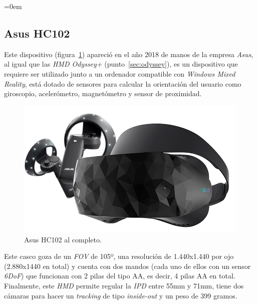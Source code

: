 \parindent=0em
\subsection{Asus HC102}
\noindent

Este dispositivo (figura~\ref{fig:asushc102}) apareció en el año 2018 de manos de la empresa \textit{Asus}, al igual que las \textit{HMD Odyssey+} (punto~\ref{sec:odyssey}), es un dispositivo que requiere ser utilizado junto a un ordenador compatible con \textit{Windows Mixed Reality}, está dotado de sensores para calcular la orientación del usuario como giroscopio, acelerómetro, magnetómetro y sensor de proximidad.\\

\begin{figure}[H]
    \centering
    \includegraphics[scale=0.45]{Images/Estado del arte/AsusHC102.jpg}
    \caption{Asus HC102 al completo.}
    \label{fig:asushc102}
\end{figure}

Este casco goza de un \textit{FOV} de 105º, una resolución de 1.440x1.440 por ojo (2.880x1440 en total) y cuenta con dos mandos (cada uno de ellos con un sensor \textit{6DoF}) que funcionan con 2 pilas del tipo AA, es decir, 4 pilas AA en total.\\

Finalmente, este \textit{HMD} permite regular la \textit{IPD} entre 55mm y 71mm, tiene dos cámaras para hacer un \textit{tracking} de tipo \textit{inside-out} y un peso de 399 gramos.